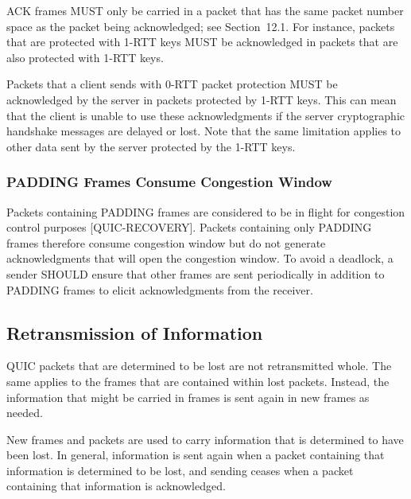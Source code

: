 \documentclass{article}
\begin{document}
ACK frames MUST only be carried in a packet that has the same packet number space as the packet being acknowledged; see Section~12.1.  For instance, packets that are protected with 1-RTT keys MUST be acknowledged in packets that are also protected with 1-RTT keys.

Packets that a client sends with 0-RTT packet protection MUST be acknowledged by the server in packets protected by 1-RTT keys.  This can mean that the client is unable to use these acknowledgments if the server cryptographic handshake messages are delayed or lost. Note that the same limitation applies to other data sent by the server protected by the 1-RTT keys.

\subsubsection{PADDING Frames Consume Congestion Window}

Packets containing PADDING frames are considered to be in flight for congestion control purposes [QUIC-RECOVERY].  Packets containing only PADDING frames therefore consume congestion window but do not generate acknowledgments that will open the congestion window.  To avoid a deadlock, a sender SHOULD ensure that other frames are sent periodically in addition to PADDING frames to elicit acknowledgments from the receiver.

\subsection{Retransmission of Information}

QUIC packets that are determined to be lost are not retransmitted whole.  The same applies to the frames that are contained within lost packets.  Instead, the information that might be carried in frames is sent again in new frames as needed.

New frames and packets are used to carry information that is determined to have been lost.  In general, information is sent again when a packet containing that information is determined to be lost, and sending ceases when a packet containing that information is acknowledged.
\end{document}
